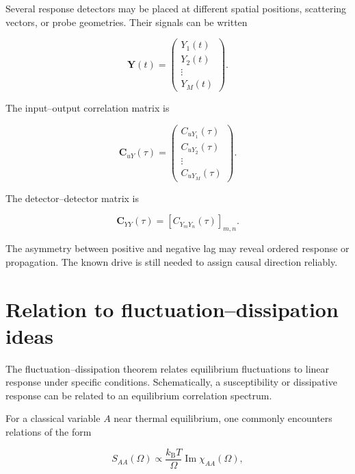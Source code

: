 \documentclass[11pt,letterpaper]{article}
\begin{document}
Several response detectors may be placed at different spatial positions,
scattering vectors, or probe geometries. Their signals can be written

\begin{equation}
    \bm{Y}(t)
    =
    \begin{pmatrix}
    Y_1(t)\\
    Y_2(t)\\
    \vdots\\
    Y_M(t)
    \end{pmatrix}.
\end{equation}

The input--output correlation matrix is

\begin{equation}
    \bm{C}_{uY}(\tau)
    =
    \begin{pmatrix}
    C_{uY_1}(\tau)\\
    C_{uY_2}(\tau)\\
    \vdots\\
    C_{uY_M}(\tau)
    \end{pmatrix}.
\end{equation}

The detector--detector matrix is

\begin{equation}
    \bm{C}_{YY}(\tau)
    =
    \left[
    C_{Y_mY_n}(\tau)
    \right]_{m,n}.
\end{equation}

The asymmetry between positive and negative lag may reveal ordered response
or propagation. The known drive is still needed to assign causal direction
reliably.

\section{Relation to fluctuation--dissipation ideas}

The fluctuation--dissipation theorem relates equilibrium fluctuations to
linear response under specific conditions. Schematically, a susceptibility
or dissipative response can be related to an equilibrium correlation
spectrum.

For a classical variable $A$ near thermal equilibrium, one commonly
encounters relations of the form

\begin{equation}
    S_{AA}(\Omega)
    \propto
    \frac{k_{\mathrm B}T}{\Omega}
    \operatorname{Im}\chi_{AA}(\Omega),
    \label{eq:fdt_schematic}
\end{equation}
\end{document}
